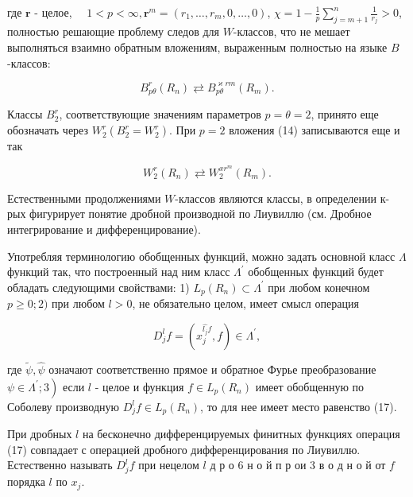 \documentclass[10pt]{article}
\begin{document}
где $\boldsymbol{r}$ - целое, $\quad 1<p<\infty, \boldsymbol{r}^{m}=\left(r_{1}, \ldots, r_{m}, 0, \ldots, 0\right)$, $\chi=1-\frac{1}{p} \sum_{j=m+1}^{n} \frac{1}{r_{j}}>0$, полностью решающие проблему следов для $W$-классов, что не мешает выполняться взаимно обратным вложениям, выраженным полностью на языке $B$-классов:



\[

B_{p \theta}^{r}\left(R_{n}\right) \rightleftarrows B_{p \theta}^{\varkappa r m}\left(R_{m}\right) .

\]



Классы $B_{2}^{r}$, соответствующие значениям параметров $p=\theta=2$, принято еще обозначать через $W_{2}^{r}\left(B_{2}^{r}=W_{2}^{r}\right)$. При $p=2$ вложения (14) записываются еще и так



\[

W_{2}^{r}\left(R_{n}\right) \rightleftarrows W_{2}^{x r^{m}}\left(R_{m}\right) .

\]



Естественными продолжениями $W$-классов являются классы, в определении к-рых фигурирует понятие дробной производной по Лиувиллю (см. Дробное интегрирование и дифференцирование).



Употребляя терминологию обобщенных функций, можно задать основной класс $\Lambda$ функций так, что построенный над ним класс $\Lambda^{\prime}$ обобщенных функций будет обладать следующими свойствами: 1) $L_{p}\left(R_{n}\right) \subset \Lambda^{\prime}$ при любом конечном $p \geqslant 0 ; 2)$ при любом $l>0$, не обязательно целом, имеет смысл операция



\[

D_{j}^{l} f=\left(x_{j}^{\widehat{l_{j}} f}, f\right) \in \Lambda^{\prime},

\]



где $\tilde{\psi}, \hat{\psi}$ означают соответственно прямое и обратное Фурье преобразование $\left.\psi \in \Lambda^{\prime} ; 3\right)$ если $l$ - целое и функция $f \in L_{p}\left(R_{n}\right)$ имеет обобщенную по Соболеву производную $D_{j}^{l} f \in L_{p}\left(R_{n}\right)$, то для нее имеет место равенство (17).



При дробных $l$ на бесконечно дифференцируемых финитных функциях операция (17) совпадает с операцией дробного дифференцирования по Лиувиллю. Естественно называть $D_{j}^{l} f$ при нецелом $l$ д р о 6 н о й п р ои 3 в о д н о й от $f$ порядка $l$ по $x_{j}$.
\end{document}
